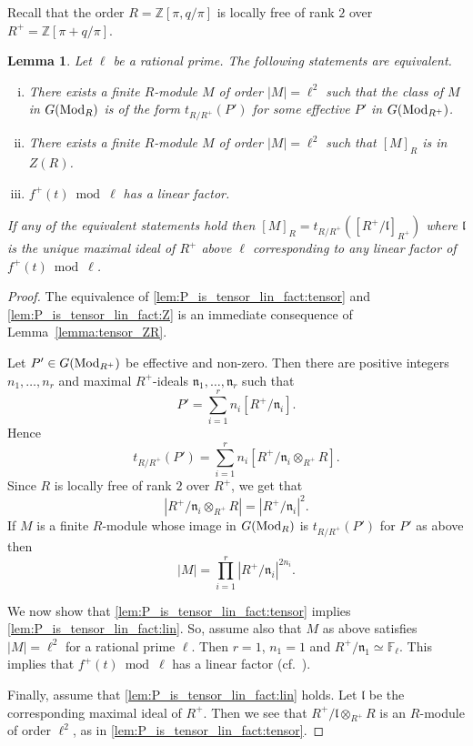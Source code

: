 \documentclass[11pt]{amsart}
\newcommand\F{\mathbb{F}}
\newcommand\Z{\mathbb{Z}}
\def\Mod{\mathop{\rm Mod}\nolimits}
\newcommand\frl{\mathfrak{l}}
\newcommand\frn{\mathfrak{n}}
\theoremstyle{plain}
\newtheorem{lemma}[theorem]{Lemma}
\theoremstyle{definition}
\begin{document}
Recall that the order $R=\Z[\pi,q/\pi]$ is locally free of rank $2$ over $R^+=\Z[\pi +q/\pi]$.
\begin{lemma}\label{lem:P_is_tensor_lin_fact}
    Let $\ell$ be a rational prime.
    The following statements are equivalent.
    \begin{enumerate}[(i)]
        \item \label{lem:P_is_tensor_lin_fact:tensor} There exists a finite $R$-module $M$ of order $|M|=\ell^2$ such that the class of $M$ in $G(\Mod_{R})$ is of the form $t_{R/R^+}(P')$ for some effective $P'$ in $G(\Mod_{R^+})$.
        \item \label{lem:P_is_tensor_lin_fact:Z} There exists a finite $R$-module $M$ of order $|M|=\ell^2$ such that $[M]_R$ is in $Z(R)$. 
        \item \label{lem:P_is_tensor_lin_fact:lin} $f^+(t) \bmod \ell$ has a linear factor. 
    \end{enumerate}
    If any of the equivalent statements hold then $[M]_R = t_{R/R^+}([R^+/\frl]_{R^+})$ where $\frl$ is the unique maximal ideal of $R^+$ above $\ell$ corresponding to any linear factor of $f^+(t) \bmod \ell$.
\end{lemma}
\begin{proof}
    The equivalence of \ref{lem:P_is_tensor_lin_fact:tensor} and \ref{lem:P_is_tensor_lin_fact:Z} is an immediate consequence of Lemma~\ref{lemma:tensor_ZR}.

    Let $P' \in G(\Mod_{R^+})$ be effective and non-zero.
    Then there are positive integers $n_1,\ldots,n_r$ and maximal $R^+$-ideals $\frn_1,\ldots,\frn_r$ such that 
    \[ P' = \sum_{i=1}^r n_i[R^+/\frn_i]. \]
    Hence
    \[ t_{R/R^+}(P') = \sum_{i=1}^r n_i[R^+/\frn_i \otimes_{R^+} R]. \]
    Since $R$ is locally free of rank $2$ over $R^+$, we get that
    \[ |R^+/\frn_i \otimes_{R^+} R| = |R^+/\frn_i|^2. \]
    If $M$ is a finite $R$-module whose image in $G(\Mod_{R})$ is $t_{R/R^+}(P')$ for $P'$ as above then
    \[ |M| = \prod_{i=1}^r |R^+/\frn_i|^{2n_i}. \]

    We now show that \ref{lem:P_is_tensor_lin_fact:tensor} implies \ref{lem:P_is_tensor_lin_fact:lin}.
    So, assume also that $M$ as above satisfies $|M|=\ell^2$ for a rational prime $\ell$.
    Then $r=1$, $n_1=1$ and $R^+/\frn_1 \simeq \F_\ell$.  
    This implies that $f^+(t) \bmod \ell$ has a linear factor (cf.~\cite[Thm.~8.2]{Stevenhagen08}).

    Finally, assume that \ref{lem:P_is_tensor_lin_fact:lin} holds.
    Let $\frl$ be the corresponding maximal ideal of $R^+$.
    Then we see that $R^+/\frl\otimes_{R^+}R$ is an $R$-module of order $\ell^2$, as in \ref{lem:P_is_tensor_lin_fact:tensor}.
\end{proof}
\end{document}
